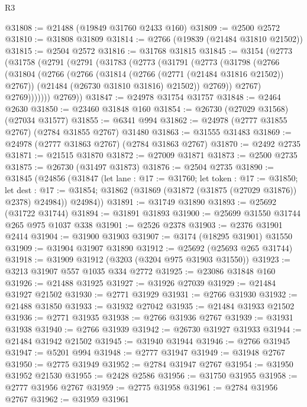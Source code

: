 \begin{lexlean}{R3}
\begin{coremodule}
@31808 := @21488 (@19849 @31760 @2433 @160)
@31809 := @2500 @2572
@31810 := @31808 @31809
@31814 := @2766 (@19839 (@21484 @31810 @21502))
@31815 := @2504 @2572
@31816 := @31768 @31815
@31845 := @3154
    (@2773
      (@31758
        (@2791
          (@2791
            (@31783
              (@2773
                (@31791
                  (@2773
                    (@31798
                      (@2766
                        (@31804
                          (@2766
                            (@2766
                              (@31814 (@2766 (@2771 (@21484 @31816 @21502)) @2767))
                              (@21484 (@26730 @31810 @31816) @21502))
                            @2769))
                        @2767)
                      @2769)))))))
        @2769))
@31847 := @24978 @31754 @31757
@31848 := @2464 @2630
@31850 := @23460 @31848 @160
@31854 := @26730 (@27029 @31568) (@27034 @31577)
@31855 := @6341 @994
@31862 := @24978 (@2777 @31855 @2767) (@2784 @31855 @2767) @31480
@31863 := @31555 @31483
@31869 := @24978 (@2777 @31863 @2767) (@2784 @31863 @2767)
@31870 := @2492 @2735
@31871 := @21515 @31870
@31872 := @27009 @31871
@31873 := @2500 @2735
@31875 := @26730 (@31497 @31873)
@31876 := @2504 @2735
@31890 := @31845
    (@24856
      (@31847
        (let lane : @17 := @31760;
        let token : @17 := @31850;
        let dest : @17 := @31854; @31862 (@31869 (@31872 (@31875 (@27029 @31876)) @2378) @24984))
        @24984))
@31891 := @31749 @31890
@31893 := @25692 (@31722 @31744)
@31894 := @31891 @31893
@31900 := @25699 @31550 @31744 @265 @975 @1037 @338
@31901 := @2526 @2378
@31903 := @2376 @31901 @2414
@31904 := @31900 @31903
@31907 := @3174 (@18295 @31901) @31550
@31909 := @31904 @31907 @31890
@31912 := @25692 (@25693 @265 @31744)
@31918 := @31909 @31912 (@3203 (@3204 @975 @31903 @31550))
@31923 := @3213 @31907 @557 @1035 @334 @2772
@31925 := @23086 @31848 @160
@31926 := @21488 @31925
@31927 := @31926 @27039
@31929 := @21484 @31927 @21502
@31930 := @2771 @31929
@31931 := @2766 @31930
@31932 := @21488 @31850
@31933 := @31932 @27042
@31935 := @21484 @31933 @21502
@31936 := @2771 @31935
@31938 := @2766 @31936 @2767
@31939 := @31931 @31938
@31940 := @2766 @31939
@31942 := @26730 @31927 @31933
@31944 := @21484 @31942 @21502
@31945 := @31940 @31944
@31946 := @2766 @31945
@31947 := @5201 @994
@31948 := @2777 @31947
@31949 := @31948 @2767
@31950 := @2775 @31949
@31952 := @2784 @31947 @2767
@31954 := @31950 @31952 @21530
@31955 := @2428 @2586
@31956 := @31750 @31955
@31958 := @2777 @31956 @2767
@31959 := @2775 @31958
@31961 := @2784 @31956 @2767
@31962 := @31959 @31961

\end{coremodule}
\end{lexlean}
